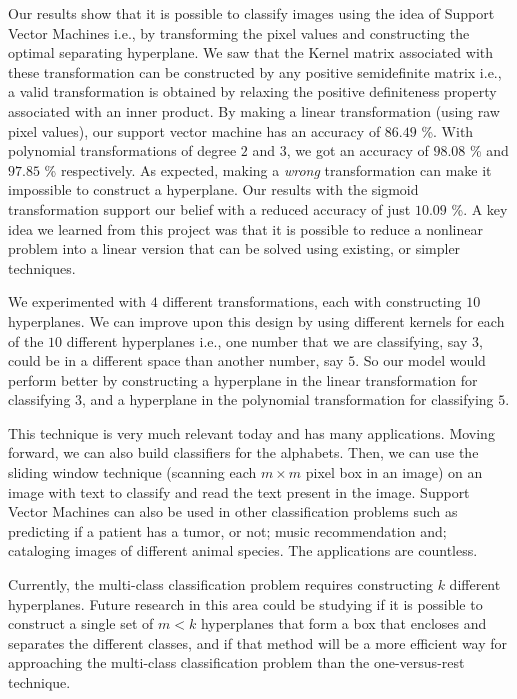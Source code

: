 Our results show that it is possible to classify images using the idea of Support Vector Machines i.e., by transforming the pixel values and constructing the optimal separating hyperplane. We saw that the Kernel matrix associated with these transformation can be constructed by any positive semidefinite matrix i.e., a valid transformation is obtained by relaxing the positive definiteness property associated with an inner product. By making a linear transformation (using raw pixel values), our support vector machine has an accuracy of $86.49$ \%. With polynomial transformations of degree $2$ and $3$, we got an accuracy of $98.08$ \% and $97.85$ \% respectively. As expected, making a \textit{wrong} transformation can make it impossible to construct a hyperplane. Our results with the sigmoid transformation support our belief with a reduced accuracy of just $10.09$ \%. A key idea we learned from this project was that it is possible to reduce a nonlinear problem into a linear version that can be solved using existing, or simpler techniques. 

We experimented with $4$ different transformations, each with constructing $10$ hyperplanes. We can improve upon this design by using different kernels for each of the $10$ different hyperplanes i.e., one number that we are classifying, say $3$, could be in a different space than another number, say $5$. So our model would perform better by constructing a hyperplane in the linear transformation for classifying $3$, and a hyperplane in the polynomial transformation for classifying $5$.

This technique is very much relevant today and has many applications. Moving forward, we can also build classifiers for the alphabets. Then, we can use the sliding window technique (scanning each $m\times m$ pixel box in an image) on an image with text to classify and read the text present in the image. Support Vector Machines can also be used in other classification problems such as predicting if a patient has a tumor, or not; music recommendation and; cataloging images of different animal species. The applications are countless.

Currently, the multi-class classification problem requires constructing $k$ different hyperplanes. Future research in this area could be studying if it is possible to construct a single set of $m < k$ hyperplanes that form a box that encloses and separates the different classes, and if that method will be a more efficient way for approaching the multi-class classification problem than the one-versus-rest technique.